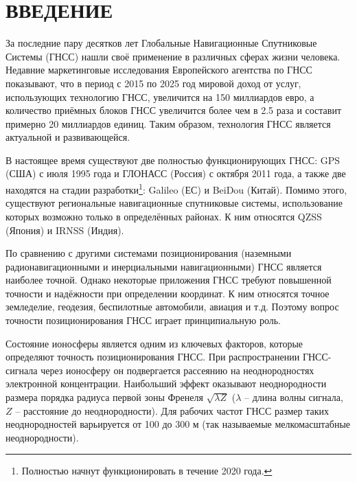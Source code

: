 \newpage
{}
{}
\section*{ВВЕДЕНИЕ} 

За последние пару десятков лет Глобальные Навигационные Спутниковые Системы (ГНСС) нашли своё применение в различных сферах жизни человека.
Недавние маркетинговые исследования Европейского агентства по ГНСС \cite{1} показывают, что в период с 2015 по 2025 год мировой доход от услуг, использующих технологию ГНСС, увеличится на 150 миллиардов евро, а количество приёмных блоков ГНСС увеличится более чем в 2.5 раза и составит примерно 20 миллиардов единиц. 
Таким образом, технология ГНСС является актуальной и развивающейся.

В настоящее время существуют две полностью функционирующих ГНСС: GPS (США) с июля 1995 года и ГЛОНАСС (Россия) с октября 2011 года, а также две находятся на стадии разработки\footnote{Полностью начнут функционировать в течение 2020 года.}: Galileo (ЕС) и BeiDou (Китай).
Помимо этого, существуют региональные навигационные спутниковые системы, использование которых возможно только в определённых районах.
К ним относятся QZSS (Япония) и IRNSS (Индия).

По сравнению с другими системами позиционирования (наземными радионавигационными и инерциальными навигационными) ГНСС является наиболее точной.
Однако некоторые приложения ГНСС требуют повышенной точности и надёжности при определении координат.
К ним относятся точное земледелие, геодезия, беспилотные автомобили, авиация и т.д.  
Поэтому вопрос точности позиционирования ГНСС играет принципиальную роль.

Состояние ионосферы является одним из ключевых факторов, которые определяют точность позиционирования ГНСС. 
При распространении ГНСС-сигнала через ионосферу он подвергается рассеянию на неоднородностях электронной концентрации. 
Наибольший эффект оказывают неоднородности размера порядка радиуса первой зоны Френеля $\sqrt{\lambda Z}$ ($\lambda$ -- длина волны сигнала, $Z$ -- расстояние до неоднородности). 
Для рабочих частот ГНСС размер таких неоднородностей варьируется от 100 до 300 м (так называемые мелкомасштабные неоднородности). 

